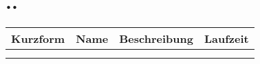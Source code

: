 \section{..}
\begin{tabularx}{\textwidth}{|l|X|X|X|} \hline
Kurzform & Name & Beschreibung & Laufzeit\\ \hline \hline
  &  &  &  \\ \hline
  &  &  &  \\ \hline
\end{tabularx}
